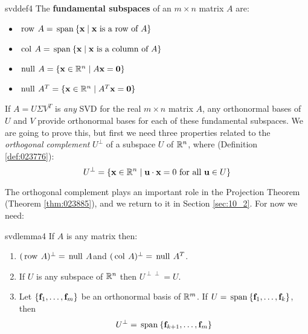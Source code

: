 \begin{definition}{}{svddef4} 
The \textbf{fundamental subspaces} of an $m\times n$ matrix $A$ are:

\begin{itemize}
\item[] $\thinspace\operatorname{row\medspace}A=\thinspace\operatorname{span\medspace}\{\textbf{x}\mid \textbf{x} \mbox{ is a row of } A\}$

\item[] $\thinspace\operatorname{col\medspace}A=\thinspace\operatorname{span\medspace}\{\textbf{x}\mid \textbf{x} \mbox{ is a column of } A\}$

\item[] $\thinspace\operatorname{null\medspace}A=\{\textbf{x}\in \mathbb{R}^{n}\mid A\textbf{x}=\textbf{0}\}$

\item[] $\thinspace\operatorname{null\medspace}A^{T}=\{\textbf{x}\in \mathbb{R}^{n}\mid A^{T}\textbf{x}=\textbf{0}\}$
\end{itemize}
\end{definition}

\noindent If $A=U\Sigma V^{T}$ is \emph{any} SVD for the real $m\times n$
matrix $A$, any orthonormal bases of $U$ and $V$ provide orthonormal bases
for each of these fundamental subspaces. We are going to prove this, but
first we need three properties related to the \emph{orthogonal complement} $U^{\perp}$ of a subspace $U$ of $\mathbb{R}^{n}$, where (Definition \ref{def:023776}):
\begin{equation*}
U^{\perp}=\{\textbf{x}\in \mathbb{R}^{n}\mid \textbf{u} \cdot \textbf{x}=0 \mbox{ for all } \textbf{u}\in U\}
\end{equation*}

\noindent The orthogonal complement plays an important role in the
Projection Theorem (Theorem \ref{thm:023885}), and we return to it in Section \ref{sec:10_2}. For
now we need:

\begin{lemma}{}{svdlemma4}
If $A$ is any matrix then:

\begin{enumerate}
\item $(\thinspace\operatorname{row\medspace}A)^{\perp}=\thinspace\operatorname{null\medspace}A$\quad and \quad $(\thinspace\operatorname{col\medspace}A)^{\perp}=\thinspace\operatorname{null\medspace}A^{T}$.

\item If $U$ is any subspace of $\mathbb{R}^{n}$ then $U^{\perp\perp}=U$.

\item Let $\{\textbf{f}_{1},\ldots ,\textbf{f}_{m}\}$ be an orthonormal basis of $\mathbb{R}^{m}$. If $U=\thinspace\operatorname{span\medspace}\{\textbf{f}_{1},\ldots ,\textbf{f}_{k}\}$, then
\begin{equation*}
U^{\perp}=\thinspace\operatorname{span\medspace}\{\textbf{f}_{k+1},\ldots ,\textbf{f}_{m}\}
\end{equation*}
\end{enumerate}
\end{lemma}


